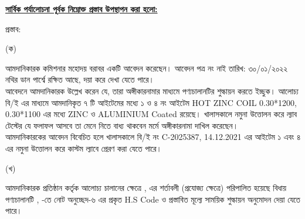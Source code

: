 \documentclass[12pt]{article}
\newcommand{\beno}{C-2025387}
\newcommand{\bedt}{14.12.2021}
\begin{document}
\begin{minipage}[t]{0.95\linewidth}
\underline{\textbf{সার্বিক পর্যালোচনা পূর্বক নিম্নোক্ত প্রস্তাব উপস্থাপন করা হলো:}}
\end{minipage}
\begin{minipage}[t]{0.05\linewidth}
\hspace{0em}
\end{minipage}
\begin{minipage}[t]{0.95\linewidth}
প্রস্তাব:
\end{minipage}
\begin{minipage}[t]{0.05\linewidth}
\hspace{0em}
\end{minipage}
\begin{minipage}[t]{0.05\linewidth}
(ক)
\end{minipage}
\begin{minipage}[t]{0.90\linewidth}
আমদানিকারক কমিশনার মহোদয় বরাবর
একটি আবেদন করেছেন। আবেদন পত্র নং নাই তারিখ: ৩০/০১/২০২২
নথির ডান পার্শ্বে রক্ষিত আছে, দয়া করে দেখা যেতে পারে।
\\
আবেদনে আমদানিকারক উল্লেখ করেন যে, তারা
অঙ্গীকারনামার মাধ্যমে পণ্যচালানটির শুল্কায়ন করতে
ইচ্ছুক।
আলোচ্য বি/ই এর মাধ্যমে
আমদানিকৃত ৭ টি আইটেমের মধ্যে ১ ও ৪ নং আইটেম
HOT ZINC COIL 0.30*1200, 0.30*1100
এর মধ্যে
ZINC ও ALUMINIUM Coated
রয়েছে।
খালাসকালে নমুনা উত্তোলন করে
ল্যাব টেস্টের যে ফলাফল আসবে
তা মেনে নিতে বাধ্য থাকবেন মর্মে
অঙ্গীকারনামা দাখিল করেছেন।
\\
আমদানিকারকের
আবেদন বিবেচিত হলে খালাসকালে
বি/ই নং {\beno}, {\bedt}
এর আইটেম ১ এবং ৪ এর
নমুনা উত্তোলন করে
কাস্টম ল্যাবে প্রেরণ করা যেতে পারে।
\\
\end{minipage}
\begin{minipage}[t]{0.05\linewidth}
\hspace{0em}
\end{minipage}
\begin{minipage}[t]{0.05\linewidth}
(খ)
\end{minipage}
\begin{minipage}[t]{0.90\linewidth}
আমদানিকারক প্রতিষ্ঠান কর্তৃক আলোচ্য চালানের
ক্ষেত্রে
{\srooof}, {\srooofd}
এর শর্তাবলী (প্রযোজ্য ক্ষেত্রে) পরিপালিত হয়েছে
বিধায় পণ্যচালানটি {\srooof}, {\srooofd}
{\cpcfzn} -তে নোট অনুচ্ছেদ-৬ এর প্রকৃত H.S Code
ও প্রস্তাবিত মূল্যে সাময়িক শুল্কায়ন অনুমোদন দেয়া যেতে পারে।
\\
\end{minipage}
\thispagestyle{laststyle}
\end{document}
